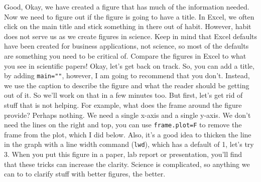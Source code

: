 \documentclass{tufte-handout}\usepackage[]{graphicx}\usepackage[]{color}
\begin{document}
Good, Okay, we have created a figure that has much of the information needed. Now we need to figure out if the figure is going to have a title. In Excel, we often click on the main title and stick something in there out of habit. However, habit does not serve us as we create figures in science. Keep in mind that Excel defaults have been created for business applications, not science, so most of the defaults are something you need to be critical of. Compare the figures in Excel to what you see in scientific papers!  Okay, let's get back on track. So, you can add a title, by adding \texttt{main=""}, however, I am going to recommend that you don't. Instead, we use the caption to describe the figure and what the reader should be getting out of it.  So we'll work on that in a few minutes too. But first, let's get rid of stuff that is not helping. For example, what does the frame around the figure provide? Perhaps nothing.  We need a single x-axis and a single y-axis.  We don't need the lines on the right and top, you can use \texttt{frame.plot=F} to remove the frame from the plot, which I did below.  Also, it's a good idea to thicken the line in the graph with a line width command (\texttt{lwd}), which has a default of 1, let's try 3. When you put this figure in a paper, lab report or presentation, you'll find that these tricks can increase the clarity. Science is complicated, so anything we can to to clarify stuff with better figures, the better.
\end{document}
